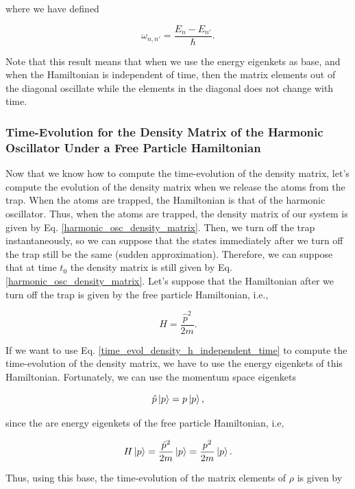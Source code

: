 \documentclass{article}
\begin{document}
where we have defined

\begin{equation}
    \omega_{n,n'} = \frac{E_{n}-E_{n'}}{\hbar}.
\end{equation}

Note that this result means that when we use the energy eigenkets as base, and when the Hamiltonian is independent of time, then the matrix elements out of the diagonal oscillate while the elements in the diagonal does not change with time.

\subsubsection{Time-Evolution for the Density Matrix of the Harmonic Oscillator Under a Free Particle Hamiltonian}
Now that we know how to compute the time-evolution of the density matrix, let's compute the evolution of the density matrix when we release the atoms from the trap. When the atoms are trapped, the Hamiltonian is that of the harmonic oscillator. Thus, when the atoms are trapped, the density matrix of our system is given by Eq. \ref{harmonic_osc_density_matrix}. Then, we turn off the trap instantaneously, so we can suppose that the states immediately after we turn off the trap still be the same (sudden approximation). Therefore, we can suppose that at time $t_{0}$ the density matrix is still given by Eq. \ref{harmonic_osc_density_matrix}. Let's suppose that the Hamiltonian after we turn off the trap is given by the free particle Hamiltonian, i.e.,

\begin{equation*}
    H = \frac{\hat{p}^{2}}{2m}.
\end{equation*}

If we want to use Eq. \ref{time_evol_density_h_independent_time} to compute the time-evolution of the density matrix, we have to use the energy eigenkets of this Hamiltonian. Fortunately, we can use the momentum space eigenkets

\begin{equation}
    \hat{p}\ket{p} = p \ket{p},
\end{equation}

since the are energy eigenkets of the free particle Hamiltonian, i.e,

\begin{equation}
   H \ket{p} = \frac{\hat{p}^{2}}{2m} \ket{p} = \frac{p^{2}}{2m} \ket{p}.
\end{equation}

Thus, using this base, the time-evolution of the matrix elements of $\rho$ is given by
\end{document}
